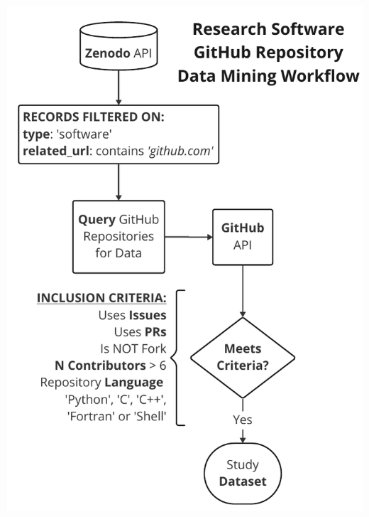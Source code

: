 \documentclass[25pt, a0paper, landscape, margin=10mm, innermargin=15mm, blockverticalspace=10mm, subcolspace=7mm, dvipsnames]{tikzposter} %
\begin{document}
\begin{columns}
{\begin{multicols}{2}
{\begin{tikzfigure}
            \includegraphics[height=287mm]{Figures/epccposter - DataMiningWorkflow.pdf}

\end{tikzfigure}}
\end{multicols}}
\end{columns}
\end{document}
